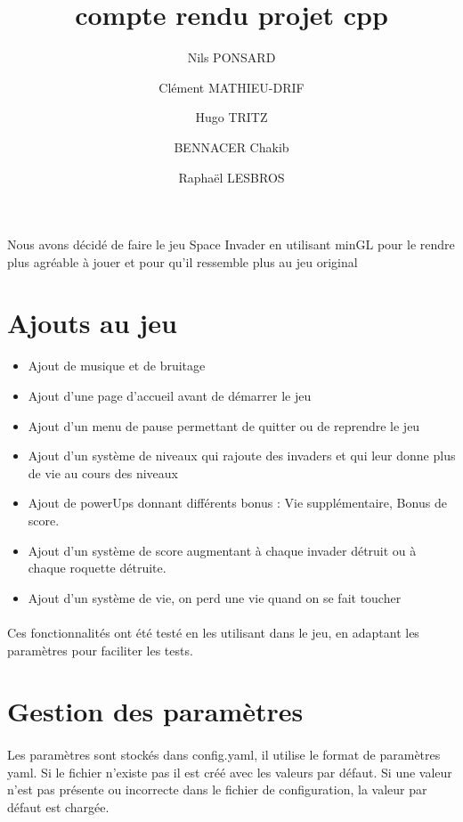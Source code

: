 \documentclass{article}
\begin{document}
\author{Nils PONSARD \and Clément MATHIEU-DRIF \and
Hugo TRITZ \and BENNACER Chakib \and
Raphaël LESBROS}
\title{compte rendu projet cpp}
\maketitle
\paragraph{} Nous avons décidé de faire le jeu Space Invader en utilisant minGL pour le rendre plus agréable à jouer et pour qu'il ressemble plus au jeu original
\section{Ajouts au jeu}
\begin{itemize}
    \item Ajout de musique et de bruitage 
    \item Ajout d'une page d'accueil avant de démarrer le jeu 
    \item Ajout d'un menu de pause permettant de quitter ou de reprendre le jeu
    \item Ajout d'un système de niveaux qui rajoute des invaders et qui leur donne plus de vie au cours des niveaux 
    \item Ajout de powerUps donnant différents bonus : Vie supplémentaire, Bonus de score.
    \item Ajout d'un système de score augmentant à chaque invader détruit ou à chaque roquette détruite.
    \item Ajout d'un système de vie, on perd une vie quand on se fait toucher
\end{itemize}
\paragraph{} Ces fonctionnalités ont été testé en les utilisant dans le jeu, en adaptant les paramètres pour faciliter les tests.
\section{Gestion des paramètres}
\paragraph{} Les paramètres sont stockés dans config.yaml, il utilise le format de paramètres yaml.
Si le fichier n'existe pas il est créé avec les valeurs par défaut. Si une valeur n'est pas présente ou incorrecte dans le fichier de configuration, la valeur par défaut est chargée.
\end{document}
